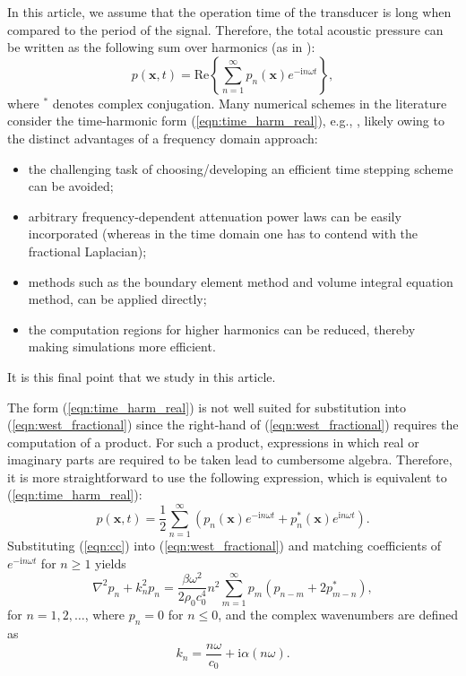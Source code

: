 \documentclass[preprint]{JASA}
\newcommand{\bx}{\mathbf{x}}
\newcommand{\red}[1]{{\color{red} #1}}
\begin{document}
In this article, we assume that the operation time of the transducer is long
when compared to the period of the signal. Therefore, the total acoustic 
pressure can be written as the following sum over harmonics 
(as in \cite{du2013fast,soneson2017extending}):
\red{
\begin{equation}
    p(\bx, t) = \text{Re} \left\{\sum_{n=1}^{\infty} 
        p_n(\bx)e^{-\text{i}n\omega t}\right\},
    \label{eqn:time_harm_real}
\end{equation}
}
where $^*$ denotes complex conjugation. 
Many numerical schemes in the literature consider the time-harmonic form 
(\ref{eqn:time_harm_real}), e.g., \cite{campos1999finite, du2013fast,soneson2017extending,
van2015fast}, likely owing to the distinct advantages of a frequency domain 
approach:
\begin{itemize}
    \item the challenging task of choosing/developing an efficient time stepping 
    scheme can be avoided; 
    \item arbitrary frequency-dependent attenuation power laws can be easily incorporated
    (whereas in the time domain one has to contend with the fractional Laplacian);
    \item methods such as the boundary element method 
    and volume integral equation method, can be applied directly;
    \item the computation regions for higher harmonics can 
    be reduced, thereby making simulations more efficient.
\end{itemize}
It is this final point that we study in this article.
    
The form (\ref{eqn:time_harm_real}) is not well suited for 
substitution into (\ref{eqn:west_fractional}) 
since the right-hand of (\ref{eqn:west_fractional}) requires the computation of 
a product. For such a product, expressions in which real or imaginary parts are 
required to be taken lead to cumbersome algebra. Therefore, it is more 
straightforward to use the following expression, which is equivalent to 
(\ref{eqn:time_harm_real}):
\begin{equation}
    p(\bx,t) = \frac{1}{2}\sum_{n=1}^{\infty}\left(p_n(\bx)e^{-\text{i}n\omega t} + 
                                       p_n^*(\bx)e^{\text{i}n\omega t}\right).
    \label{eqn:cc}
\end{equation}  
Substituting (\ref{eqn:cc}) into (\ref{eqn:west_fractional}) and matching 
coefficients of $e^{-\text{i} n\omega t}$ for $n\geq 1$ yields  
\begin{equation}
    \nabla^2 p_n 
    + k_n^2 p_n = \frac{\beta\omega^2}{2\rho_0 c_0^4}n^2
    \sum_{m=1}^{\infty}p_m(p_{n-m}+2p^*_{m-n}),
    \label{eqn:cascade_1}
\end{equation}
for $n=1,2,\ldots$, where $p_n = 0$ for $n\leq 0$, and the complex wavenumbers are defined as 
\begin{equation}
    k_n = \frac{n\omega}{c_0} + \text{i}\alpha(n\omega).
\end{equation}
    
\end{document}
